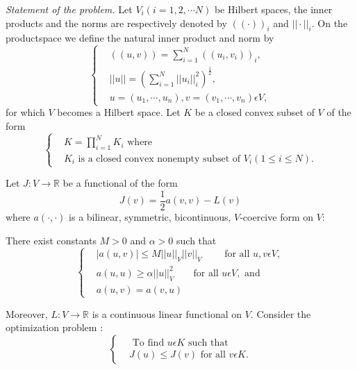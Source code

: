 {\em Statement of the problem.} Let $V_{i}(i = 1, 2, \cdots N)$ be Hilbert spaces, the inner products and the norms are respectively denoted by $(( \cdot))_{i}$ and $|| \cdot ||_{i}$. On the product\pageoriginale space we define the natural inner product and norm by
\begin{equation*}
\begin{cases}
& ((u, v)) = \sum\limits_{i=1}^{N} ((u_{i}, v_{i}))_{i},\\
& || u || = \left(\sum\limits_{i=1}^{N} ||u_{i}||_{i}^{2} \right)^{\frac{1}{2}},\\
& u = (u_{1}, \cdots, u_{n}), v = (v_{1}, \cdots, v_{n}) \epsilon V,\tag{4.25}\label{chap4-eq4.25}
\end{cases}
\end{equation*}
for which $V$ becomes a Hilbert space. Let $K$ be a closed convex subset of $V$ of the form
\begin{equation*}
\begin{cases}
& K = \prod_{i=1}^{N} K_{i} \text{ where }\\
& K_{i} \text{ is a closed convex nonempty subset of } V_{i} (1 \leq i \leq N).\tag{4.26}\label{chap4-eq4.26}
\end{cases}
\end{equation*}

Let $J : V \to \mathbb{R}$ be a functional of the form
\begin{equation*}
J(v) = \frac{1}{2} a(v, v) - L(v)\tag{4.27}\label{chap4-eq4.27}
\end{equation*}
where $a(\cdot , \cdot)$ is a bilinear, symmetric, bicontinuous, $V$-coercive form on $V$:

There exist constants $M > 0$ and $\alpha > 0$ such that
\begin{equation*}
\begin{cases}
& |a(u, v)| \leq M ||u||_{V} ||v||_{V} \qquad\text{ for all } u, v \epsilon V,\\
& a(u, u) \geq \alpha ||u||_{V}^{2} \qquad\text{for all } u \epsilon V, \text{ and }\\
& a(u, v) = a(v, u)\tag{4.28}\label{chap4-eq4.28}
\end{cases}
\end{equation*}

Moreover, $L : V \to \mathbb{R}$ is a continuous linear functional on $V$. Consider the optimization problem :
\begin{equation*}
\begin{cases}
& \text{ To find } u \epsilon K \text{ such that }\\
& J(u) \leq J(v) \text{ for all } v \epsilon K.\tag{4.29}\label{chap4-eq4.29}
\end{cases}
\end{equation*}

